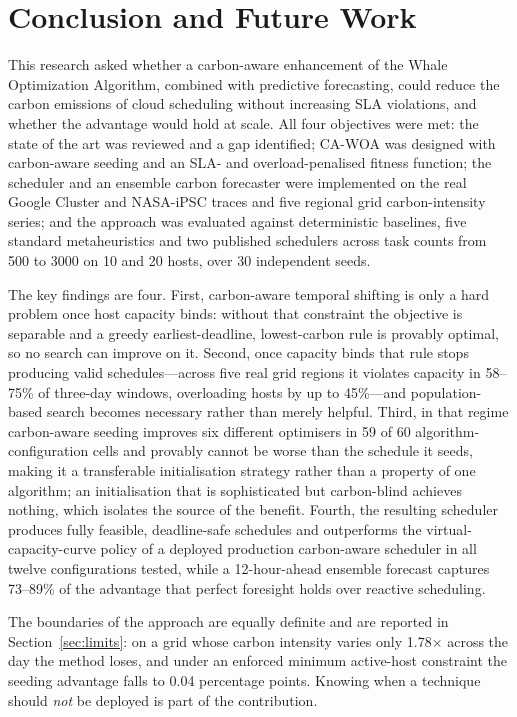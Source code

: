 \documentclass[12pt,a4paper]{article}
\begin{document}
\section{Conclusion and Future Work}\label{sec:conc}
This research asked whether a carbon-aware enhancement of the Whale Optimization Algorithm, combined with
predictive forecasting, could reduce the carbon emissions of cloud scheduling without increasing SLA
violations, and whether the advantage would hold at scale. All four objectives were met: the state of the art
was reviewed and a gap identified; CA-WOA was designed with carbon-aware seeding and an SLA- and
overload-penalised fitness function; the scheduler and an ensemble carbon forecaster were implemented on the
real Google Cluster and NASA-iPSC traces and five regional grid carbon-intensity series; and the approach was
evaluated against deterministic baselines, five standard metaheuristics and two published schedulers across
task counts from 500 to 3000 on 10 and 20 hosts, over 30 independent seeds.

The key findings are four. First, carbon-aware temporal shifting is only a hard problem once host capacity
binds: without that constraint the objective is separable and a greedy earliest-deadline, lowest-carbon rule
is provably optimal, so no search can improve on it. Second, once capacity binds that rule stops producing
valid schedules---across five real grid regions it violates capacity in 58--75\% of three-day windows,
overloading hosts by up to 45\%---and population-based search becomes necessary rather than merely helpful.
Third, in that regime carbon-aware seeding improves six different optimisers in 59 of 60
algorithm-configuration cells and provably cannot be worse than the schedule it seeds, making it a
transferable initialisation strategy rather than a property of one algorithm; an initialisation that is
sophisticated but carbon-blind achieves nothing, which isolates the source of the benefit. Fourth, the
resulting scheduler produces fully feasible, deadline-safe schedules and outperforms the virtual-capacity-curve
policy of a deployed production carbon-aware scheduler in all twelve configurations tested, while a
12-hour-ahead ensemble forecast captures 73--89\% of the advantage that perfect foresight holds over
reactive scheduling.

The boundaries of the approach are equally definite and are reported in Section~\ref{sec:limits}: on a grid
whose carbon intensity varies only 1.78$\times$ across the day the method loses, and under an enforced
minimum active-host constraint the seeding advantage falls to 0.04 percentage points. Knowing when a technique
should \emph{not} be deployed is part of the contribution.
\end{document}
